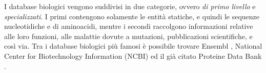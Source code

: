 I database biologici vengono suddivisi in due categorie, ovvero \textit{di primo livello} e \textit{specializzati}. I primi contengono solamente le entità statiche, e quindi le sequenze nucleotidiche e di aminoacidi, mentre i secondi raccolgono informazioni relative alle loro funzioni, alle malattie dovute a mutazioni, pubblicazioni scientifiche, e così via.
\newline
Tra i database biologici più famosi è possibile trovare Ensembl \cite{ensembl}, National Center for Biotechnology Information (NCBI) \cite{NCBI} ed il già citato Proteine Data Bank \cite{proteineDataBank}.